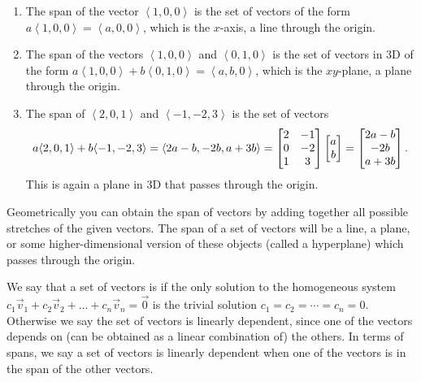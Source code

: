 {\begin{example}\label{ex span}
\begin{enumerate}
	\item The span of the vector $\left<1,0,0\right>$ is the set of vectors of the form $a\left<1,0,0\right> = \left<a,0,0\right>$, which is the $x$-axis, a line through the origin. 
	\item The span of the vectors $\left<1,0,0\right>$ and $\left<0,1,0\right>$ is the set of vectors in 3D of the form $a\left<1,0,0\right>+b\left<0,1,0\right>=\left<a,b,0\right>$, which is the $xy$-plane, a plane through the origin. 
	\item The span of $\left<2,0,1\right>$ and $\left<-1,-2,3\right>$ is the set of vectors 
	$$a\langle 2,0,1\rangle+b\langle-1,-2,3\rangle
		= \langle2a-b,-2b,a+3b\rangle
		= \begin{bmatrix} \begin{matrix} 2\\0\\1 \end{matrix}&\begin{matrix} -1\\-2\\3 \end{matrix}\end{bmatrix}
	\begin{bmatrix}a\\b\end{bmatrix} 
	=\begin{bmatrix}2a-b\\-2b\\a+3b\end{bmatrix}.$$
        This is again a plane in 3D that passes through the origin.
\end{enumerate}
\end{example}
Geometrically you can obtain the span of vectors by adding together all possible stretches of the given vectors. The span of a set of vectors will be a line, a plane, or some higher-dimensional version of these objects (called a hyperplane) which passes through the origin. 

We say that a set of vectors is  if the only solution to the homogeneous system $c_1\vec v_{1}+c_2\vec v_{2}+\ldots+c_n\vec v_{n}=\vec 0$ is the trivial solution $c_1=c_2=\cdots=c_n=0$. 
Otherwise we say the set of vectors is linearly dependent, since one of the vectors depends on (can be obtained as a linear combination of) the others. In terms of spans, we say a set of vectors is linearly dependent when one of the vectors is in the span of the other vectors. 

}
